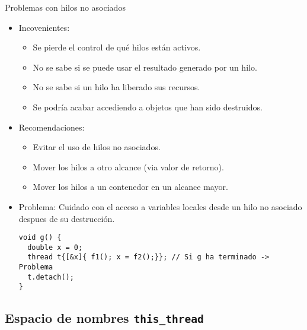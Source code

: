 \begin{frame}[fragile]{Problemas con hilos no asociados}
\begin{itemize}
  \item Incovenientes:
    \begin{itemize}
      \item Se pierde el control de qué hilos están activos.
      \item No se sabe si se puede usar el resultado generado por un hilo.
      \item No se sabe si un hilo ha liberado sus recursos.
      \item Se podría acabar accediendo a objetos que han sido destruidos.
    \end{itemize}
  \item Recomendaciones:
    \begin{itemize}
      \item Evitar el uso de hilos no asociados.
      \item Mover los hilos a otro alcance (via valor de retorno).
      \item Mover los hilos a un contenedor en un alcance mayor.
    \end{itemize}
  \item \alert{Problema}: Cuidado con el acceso a variables locales desde un hilo no asociado despues de su destrucción.
\begin{lstlisting}
void g() {
  double x = 0;
  thread t{[&x]{ f1(); x = f2();}}; // Si g ha terminado -> Problema
  t.detach();
}
\end{lstlisting}
\end{itemize}
\end{frame}

\subsection{Espacio de nombres \texttt{this\_thread}}

